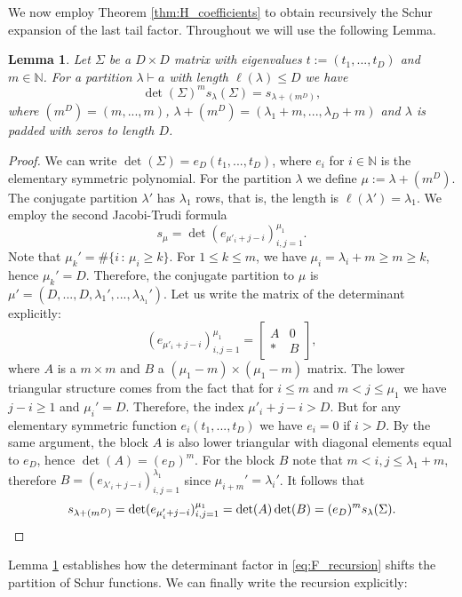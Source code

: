 \documentclass{article}
\newtheorem{lemma}[theorem]{Lemma}
\theoremstyle{definition}
\newcommand{\N}{\mathbb{N}}
\begin{document}
\noindent
We now employ Theorem \ref{thm:H_coefficients} to obtain recursively the Schur expansion of the last tail factor. Throughout we will use the following Lemma. 
\begin{lemma}\label{lemma:det_shift}
    Let $\Sigma$ be a $D\times D$ matrix with eigenvalues $t:=(t_1, ..., t_D)$ and $m \in \N$. For a partition $\lambda \vdash a$ with length $\ell(\lambda) \leq D$ we have
    \begin{equation*}
        \det(\Sigma)^ms_\lambda(\Sigma) = s_{\lambda + (m^D)},
    \end{equation*}
    where $(m^D) = (m, ..., m)$, $\lambda + (m^D) = (\lambda_1 + m, ..., \lambda_D +m)$ and $\lambda$ is padded with zeros to length $D$.
\end{lemma}
\begin{proof}We can write $\det(\Sigma) = e_D(t_1, ..., t_D)$, where $e_i$ for $i\in\N$ is the elementary symmetric polynomial. 
For the partition $\lambda$ we define $\mu := \lambda + (m^D)$. The conjugate partition $\lambda'$ has $\lambda_1$ rows, that is, the length is $\ell(\lambda') = \lambda_1$.
We employ the second Jacobi-Trudi formula \cite{Fulton_1991}
\begin{equation*}
    s_\mu = \det(e_{\mu'_i+j-i})_{i,j=1}^{\mu_1}.
\end{equation*}
Note that $\mu_k' = \#\{i\,:\,\mu_i \geq k\}$. For $1\leq k \leq m$, we have $\mu_i = \lambda_i + m \geq m \geq k$, hence $\mu_k' = D$. Therefore, the conjugate partition to $\mu$ is $\mu' = (D, ..., D, \lambda_1', ..., \lambda_{\lambda_1}')$.
Let us write the matrix of the determinant explicitly:
\begin{equation*}
(e_{\mu'_i+j-i})_{i,j=1}^{\mu_1} =
    \begin{bmatrix}
        A & 0 \\
        * & B
    \end{bmatrix},
\end{equation*}
where $A$ is a $m\times m$ and $B$ a $(\mu_1-m)\times (\mu_1-m)$ matrix. The lower triangular structure comes from the fact that for $i \leq m$ and $m < j \leq \mu_1$ we have $j-i \geq 1$ and $\mu_i' = D$. Therefore, the index $\mu'_i+j-i > D$. But for any elementary symmetric function $e_i(t_1, ..., t_D)$ we have $e_i = 0$ if $i > D$. By the same argument, the block $A$ is also  lower triangular with diagonal elements equal to $e_D$, hence $\det(A) = (e_D)^m$. For the block $B$ note that $m < i, j \leq \lambda_1 + m$, therefore $B = (e_{\lambda'_i+j-i})_{i,j=1}^{\lambda_1}$ since $\mu_{i+m}' = \lambda_i'$. It follows that 
\begin{equation*}
    s_{\lambda + (m^D)}=\det(e_{\mu'_i+j-i})_{i,j=1}^{\mu_1} = \det(A)\det(B) = (e_D)^ms_\lambda(\Sigma). \qedhere
\end{equation*}
\end{proof}
Lemma \ref{lemma:det_shift} establishes how the determinant factor in \eqref{eq:F_recursion} shifts the partition of Schur functions. We can finally write the recursion explicitly:
\end{document}
